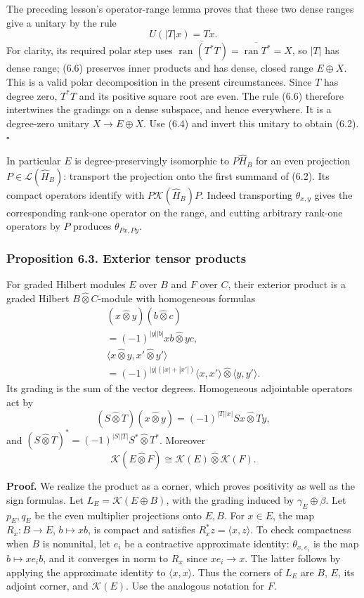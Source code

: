 \documentclass[
  11pt,
]{article}
\begin{document}
The preceding lesson's operator-range lemma proves that these two dense
ranges give a unitary by the rule \[
U(|T|x)=Tx.
\tag{6.6}
\] For clarity, its required polar step uses
\(\overline{\operatorname{ran}(T^*T)}
=\overline{\operatorname{ran}T^*}=X\), so \(|T|\) has dense range; (6.6)
preserves inner products and has dense, closed range \(E\oplus X\). This
is a valid polar decomposition in the present circumstances. Since \(T\)
has degree zero, \(T^*T\) and its positive square root are even. The
rule (6.6) therefore intertwines the gradings on a dense subspace, and
hence everywhere. It is a degree-zero unitary \(X\to E\oplus X\). Use
(6.4) and invert this unitary to obtain (6.2). \(\square\)

In particular \(E\) is degree-preservingly isomorphic to
\(P\widehat H_B\) for an even projection
\(P\in\mathcal L(\widehat H_B)\): transport the projection onto the
first summand of (6.2). Its compact operators identify with
\(P\mathcal K(\widehat H_B)P\). Indeed transporting \(\theta_{x,y}\)
gives the corresponding rank-one operator on the range, and cutting
arbitrary rank-one operators by \(P\) produces \(\theta_{Px,Py}\).

\subsubsection{Proposition 6.3. Exterior tensor
products}\label{proposition-6.3.-exterior-tensor-products}

For graded Hilbert modules \(E\) over \(B\) and \(F\) over \(C\), their
exterior product is a graded Hilbert \(B\widehat\otimes C\)-module with
homogeneous formulas \[
\begin{gathered}
(x\widehat\otimes y)(b\widehat\otimes c)\\
=(-1)^{|y||b|}xb\widehat\otimes yc,\\
\langle x\widehat\otimes y,x'\widehat\otimes y'\rangle\\
=(-1)^{|y|(|x|+|x'|)}
   \langle x,x'\rangle\widehat\otimes\langle y,y'\rangle.
\end{gathered}
\tag{6.7}
\] Its grading is the sum of the vector degrees. Homogeneous adjointable
operators act by \[
(S\widehat\otimes T)(x\widehat\otimes y)
=(-1)^{|T||x|}Sx\widehat\otimes Ty,
\tag{6.8}
\] and \((S\widehat\otimes T)^*=(-1)^{|S||T|}S^*\widehat\otimes T^*\).
Moreover \[
\mathcal K(E\widehat\otimes F)
\cong\mathcal K(E)\widehat\otimes\mathcal K(F).
\tag{6.9}
\]

\textbf{Proof.} We realize the product as a corner, which proves
positivity as well as the sign formulas. Let
\(L_E=\mathcal K(E\oplus B)\), with the grading induced by
\(\gamma_E\oplus\beta\). Let \(p_E,q_E\) be the even multiplier
projections onto \(E,B\). For \(x\in E\), the map \(R_x:B\to E\),
\(b\mapsto xb\), is compact and satisfies \(R_x^*z=\langle x,z\rangle\).
To check compactness when \(B\) is nonunital, let \(e_i\) be a
contractive approximate identity: \(\theta_{x,e_i}\) is the map
\(b\mapsto xe_ib\), and it converges in norm to \(R_x\) since
\(xe_i\to x\). The latter follows by applying the approximate identity
to \(\langle x,x\rangle\). Thus the corners of \(L_E\) are \(B\), \(E\),
its adjoint corner, and \(\mathcal K(E)\). Use the analogous notation
for \(F\).
\end{document}
